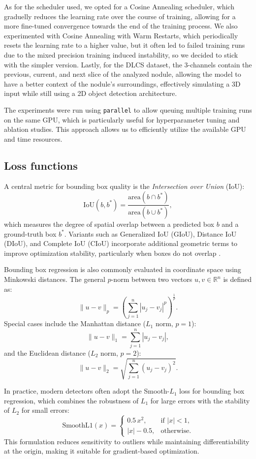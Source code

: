 As for the scheduler used, we opted for a Cosine Annealing scheduler, which graduelly reduces the learning rate over the course of training, allowing for a more fine-tuned convergence towards the end of the training process. We also experimented with Cosine Annealing with Warm Restarts, which periodically resets the learning rate to a higher value, but it often led to failed training runs due to the mixed precision training induced instability, so we decided to stick with the simpler version.
Lastly, for the DLCS dataset, the 3-channels contain the previous, current, and next slice of the analyzed nodule, allowing the model to have a better context of the nodule's surroundings, effectively simulating a 3D input while still using a 2D object detection architecture.

The experiments were run using \texttt{parallel} to allow queuing multiple training runs on the same GPU, which is particularly useful for hyperparameter tuning and ablation studies. This approach allows us to efficiently utilize the available GPU and time resources.



\subsection{Loss functions}
\label{sec:loss_functions}
A central metric for bounding box quality is the \textit{Intersection over Union} (IoU):
$$
\mathrm{IoU}(b, b^\ast) = \frac{\mathrm{area}(b \cap b^\ast)}{\mathrm{area}(b \cup b^\ast)},
$$
which measures the degree of spatial overlap between a predicted box $b$ and a ground-truth box $b^\ast$.
Variants such as Generalized IoU (GIoU), Distance IoU (DIoU), and Complete IoU (CIoU) incorporate additional geometric terms to improve optimization stability, particularly when boxes do not overlap \cite{rezatofighi2019giou,zheng2019diou, zheng2021ciou}.


Bounding box regression is also commonly evaluated in coordinate space using Minkowski distances.
The general $p$-norm between two vectors $u,v \in \mathbb{R}^n$ is defined as:
$$
\| u - v \|_p = \left( \sum_{j=1}^n |u_j - v_j|^p \right)^{\frac{1}{p}}.
$$
Special cases include the Manhattan distance ($L_1$ norm, $p=1$):
$$
\| u - v \|_1 = \sum_{j=1}^n |u_j - v_j|,
$$
and the Euclidean distance ($L_2$ norm, $p=2$):
$$
\| u - v \|_2 = \sqrt{\sum_{j=1}^n (u_j - v_j)^2}.
$$

In practice, modern detectors often adopt the Smooth-$L_1$ loss \cite{girshick2015fastrcnn} for bounding box regression, which combines the robustness of $L_1$ for large errors with the stability of $L_2$ for small errors:
$$
\mathrm{SmoothL1}(x) =
\begin{cases}
0.5\,x^2, & \text{if } |x| < 1, \\
|x| - 0.5, & \text{otherwise}.
\end{cases}
$$
This formulation reduces sensitivity to outliers while maintaining differentiability at the origin, making it suitable for gradient-based optimization.

